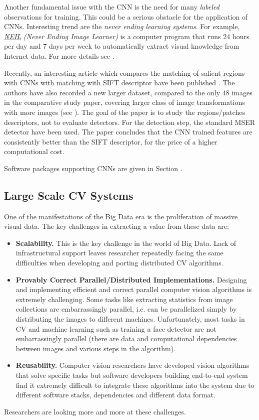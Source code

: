 Another fundamental issue with the CNN is the need for many {\em labeled} observations for training. This could be a serious obstacle for the application of CNNs. Interesting trend are the {\em never ending learning systems}. For example, \href{http://www.neil-kb.com/}{\em \underline{NEIL}} {\em (Never Ending Image Learner)} is a computer program that runs $24$ hours per day and $7$ days per week to automatically extract visual knowledge from Internet data. For more details see \cite{Chen_2013_ICCV}. 

Recently, an interesting article which compares the matching of salient regions with CNNs with matching with SIFT descriptor have been published \cite{FischerDB14}. The authors have also recorded a new larger dataset, compared to the only $48$ images in the comparative study paper, covering larger class of image transformations with more images (see ). The goal of the paper is to study the regions/patches descriptors, not to evaluate detectors. For the detection step, the standard MSER detector have been used. The paper concludes that the CNN trained features are consistently better than the SIFT descriptor, for the price of a higher computational cost.

Software packages supporting CNNs are given in Section .

\subsection{Large Scale CV Systems}
One of the manifestations of the Big Data era is the proliferation of massive visual data. The key challenges in extracting a value from these data are:
\begin{itemize}
\item{ {\bf Scalability.} This is the key challenge in the world of Big Data. Lack of infrastructural support leaves researcher repeatedly facing the same difficulties when developing and porting  distributed CV algorithms.}
\item{\bf Provably Correct Parallel/Distributed Implementations.} Designing and implementing
efficient and correct parallel computer vision algorithms is extremely challenging. Some tasks like extracting statistics from image collections are embarrassingly parallel, i.e. can be parallelized simply by distributing
the images to different machines. Unfortunately, most tasks in CV and
machine learning such as training a face detector are not embarrassingly parallel
(there are data and computational dependencies between images and various
steps in the algorithm).
\item{\bf Reusability.} Computer vision researchers have developed vision algorithms
that solve specific tasks but software developers building end-to-end system
find it extremely difficult to integrate these algorithms into the system due to
different software stacks, dependencies and different data format.
\end{itemize}
Researchers are looking more and more at these challenges.


